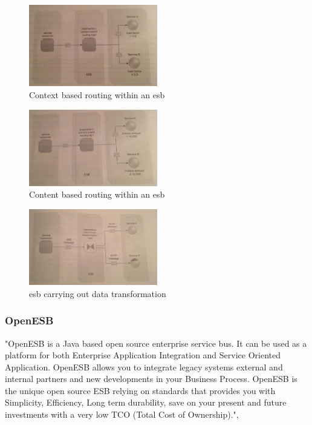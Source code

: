 \documentclass[12pt]{article}
\begin{document}
\begin{figure}[here!]
	\centering
	\includegraphics[width=0.5\textwidth]{images/context}
	  \caption{Context based routing within an \gls{esb} \cite[page 394]{grau}}
    \label{fig:context}
	\end{figure}
	\FloatBarrier
	
	
\begin{figure}[here!]
	\centering
	\includegraphics[width=0.5\textwidth]{images/content}
	   \caption{Content based routing within an \gls{esb} \cite[page 394]{grau}}
    \label{fig:content}
	\end{figure}
	\FloatBarrier


\begin{figure}[here!]
	\centering
	\includegraphics[width=0.5\textwidth]{images/page395}
	\caption{\gls{esb} carrying out data transformation \cite[page 395]{grau}}
	\label{fig:Datafromtrans}
	\end{figure}
	\FloatBarrier
\subsubsection{OpenESB}
"OpenESB is a Java based open source enterprise service bus. It can be used as a platform for both Enterprise Application Integration and Service Oriented Application. OpenESB allows you to integrate legacy systems external and internal partners and new developments in your Business Process.  OpenESB is the unique open source ESB relying on standards that provides you with Simplicity, Efficiency, Long term durability, save on your present and future investments with a very low TCO (Total Cost of Ownership).", \cite{Aboutopenesb}
\end{document}

